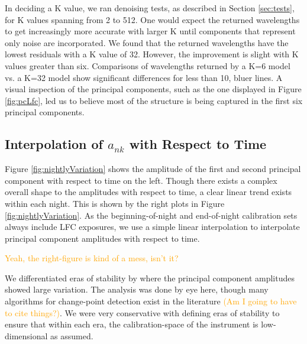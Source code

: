 \documentclass[twocolumn]{aastex63}
\newcommand{\lz}[1]{\textcolor{orange}{#1}}
\begin{document}
In deciding a K value, we ran denoising tests, as described in Section \ref{sec:tests}, for K values spanning from 2 to 512.  One would expect the returned wavelengths to get increasingly more accurate with larger K until components that represent only noise are incorporated.  We found that the returned wavelengths have the lowest residuals with a K value of 32.  However, the improvement is slight with K values greater than six.  Comparisons of wavelengths returned by a K=6 model vs. a K=32 model show significant differences for less than 10, bluer lines.  A visual inspection of the principal components, such as the one displayed in Figure \ref{fig:pcLfc}, led us to believe most of the structure is being captured in the first six principal components.

\subsection{Interpolation of $a_{nk}$ with Respect to Time}
Figure \ref{fig:nightlyVariation} shows the amplitude of the first and second principal component with respect to time on the left.  Though there exists a complex overall shape to the amplitudes with respect to time, a clear linear trend exists within each night.  This is shown by the right plots in Figure  \ref{fig:nightlyVariation}.  As the beginning-of-night and end-of-night calibration sets always include LFC exposures, we use a simple linear interpolation to interpolate principal component amplitudes with respect to time.

\lz{Yeah, the right-figure is kind of a mess, isn't it?}

We differentiated eras of stability by where the principal component amplitudes showed large variation.  The analysis was done by eye here, though many algorithms for change-point detection exist in the literature \lz{(Am I going to have to cite things?)}.  We were very conservative with defining eras of stability to ensure that within each era, the calibration-space of the instrument is low-dimensional as assumed.
\end{document}

